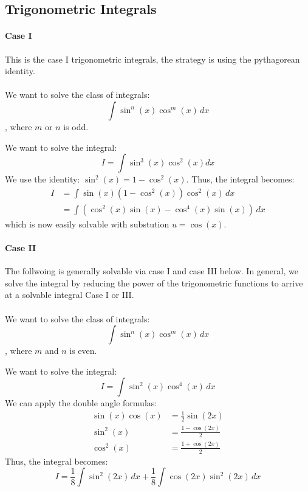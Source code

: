 \documentclass[11pt]{article}
\begin{document}
\subsection{Trigonometric Integrals}
\paragraph{Case I} This is the case I trigonometric integrals, the strategy is using the pythagorean identity.
\paragraph{} We want to solve the class of integrals:
\begin{equation}
 \int \sin^n(x) \cos^m(x) \, dx
\end{equation}
, where $m$ or $n$ is odd.
\begin{example}
We want to solve the integral:
$$ I = \int \sin^3(x) \cos^2(x) dx $$
We use the identity: $ \sin^2(x) = 1 - \cos^2(x)$. Thus, the integral becomes:
\begin{align*}
    I &= \int \sin(x)(1 - \cos^2(x)) \cos^2(x) \, dx \\
    &= \int (\cos^2(x) \sin(x) - \cos^4(x) \sin(x)) \, dx
\end{align*} 
which is now easily solvable with substution $u=\cos(x)$.
\end{example}
\paragraph{Case II} The follwoing is generally solvable via case I and case III below. In general, we solve the integral by reducing the power of the trigonometric functions to arrive at a solvable integral Case I or III.
\paragraph{} We want to solve the class of integrals:
\begin{equation} \int \sin^n(x) \cos^m(x) \, dx \end{equation}
, where $m$ and $n$ is even.
\begin{example}
We want to solve the integral:
$$ I = \int \sin^2(x) \cos^4(x) \, dx $$
We can apply the double angle formulas:
\begin{align}
    \sin(x)\cos(x) &= \frac{1}{2} \sin(2x) \\
    \sin^2(x) &= \frac{1 - \cos(2x)}{2} \\
    \cos^2(x) &= \frac{1 + \cos(2x)}{2}
\end{align}
Thus, the integral becomes:
$$ I = \frac{1}{8} \int \sin^2(2x) \, dx + \frac{1}{8} \int \cos(2x)\sin^2(2x) \, dx $$
\end{example}
\end{document}
